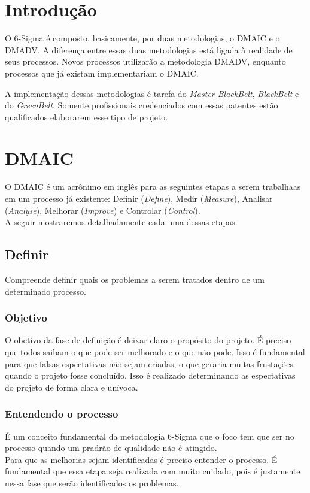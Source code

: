 \documentclass{abnt}
\begin{document}
		\section {Introdução}
		
			 O 6-Sigma é composto, basicamente, por duas metodologias, o DMAIC e o DMADV. A diferença entre 
			 essas duas metodologias está ligada à realidade de seus processos. Novos processos utilizarão 
			 a metodologia DMADV, enquanto processos que já existam implementariam o DMAIC.
			 
			 A implementação dessas metodologias é tarefa do \textit{Master BlackBelt}, \textit{BlackBelt} e do \textit{GreenBelt}. Somente profissionais 
			 credenciados com essas patentes estão qualificados elaborarem esse tipo de projeto.
			 
			\section {DMAIC}
				O DMAIC é um acrônimo em inglês para as seguintes etapas a serem trabalhaas em 
				um processo já existente: Definir (\textit{Define}), Medir (\textit{Measure}), 
				Analisar (\textit{Analyse}), Melhorar (\textit{Improve}) e Controlar (\textit{Control}).
				\\
				A seguir mostraremos detalhadamente cada uma dessas etapas.
				
				\subsection {Definir}
					Compreende definir quais os problemas a serem tratados dentro de um determinado processo.
					\subsubsection {Objetivo}
					O obetivo da fase de definição é deixar claro o propósito do projeto. É preciso que todos
					saibam o que pode ser melhorado e o que não pode. Isso é fundamental para que falsas espectativas 
					não sejam criadas, o que geraria muitas frustações quando o projeto fosse concluído. Isso é 
					realizado determinando as espectativas do projeto de forma clara e unívoca.
					\subsubsection {Entendendo o processo}
					É um conceito fundamental da metodologia 6-Sigma que o foco tem que ser no processo
					quando um pradrão de qualidade não é atingido.\\
					Para que as melhorias sejam identificadas é preciso entender o processo.  
					É fundamental que essa etapa seja realizada com muito cuidado, pois é justamente nessa
					fase que serão identificados os problemas.
\end{document}
